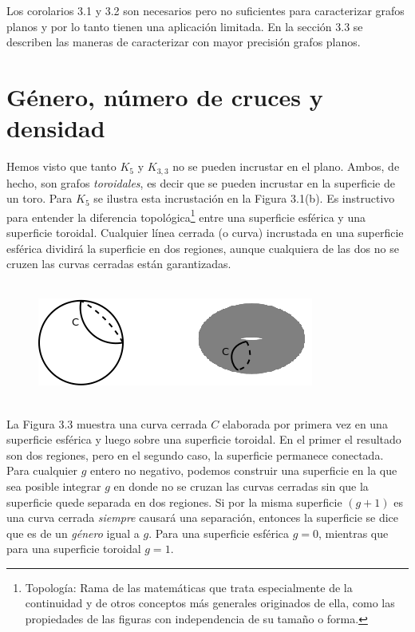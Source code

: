 \documentclass[10pt,a5paper]{book}
\begin{document}
Los corolarios 3.1 y 3.2 son necesarios pero no suficientes para caracterizar grafos planos y por lo tanto tienen una aplicación limitada. En la sección 3.3 se describen las maneras de caracterizar con mayor precisión grafos planos.

\section{Género, número de cruces y densidad}

Hemos visto que tanto $K_5$ y $K_{3,3}$ no se pueden incrustar en el plano. Ambos, de hecho, son grafos \emph{toroidales}, es decir que se pueden incrustar en la superficie de un toro. Para $K_5$ se ilustra esta incrustación en la Figura 3.1(b). Es instructivo para entender la diferencia topológica\footnote{Topología: Rama de las matemáticas que trata especialmente de la continuidad y de otros conceptos más generales originados de ella, como las propiedades de las figuras con independencia de su tamaño o forma.} entre una superficie esférica y una superficie toroidal. Cualquier línea cerrada (o curva) incrustada en una superficie esférica dividirá la superficie en dos regiones, aunque cualquiera de las dos no se cruzen las curvas cerradas están garantizadas.
\vfill
\pagebreak
\begin{figure}[H]
\caption{ }
\hrulefill{}\\
\hspace*{.65in}\includegraphics[scale=.4]{Fig3_3.png}
\end{figure}
\hrulefill{}\\

La Figura 3.3 muestra una curva cerrada $C$ elaborada por primera vez en una superficie esférica y luego sobre una superficie toroidal. En el primer el resultado son dos regiones, pero en el segundo caso, la superficie permanece conectada. Para cualquier $g$ entero no negativo, podemos construir una superficie en la que sea posible integrar $g$ en donde no se cruzan las curvas cerradas sin que la superficie quede separada en dos regiones. Si por la misma superficie $(g+1)$ es una curva cerrada \emph{siempre} causará una separación, entonces la superficie se dice que es de un \emph{género} igual a $g$. Para una superficie esférica $g=0$, mientras que para una superficie toroidal $g=1$.
\end{document}
